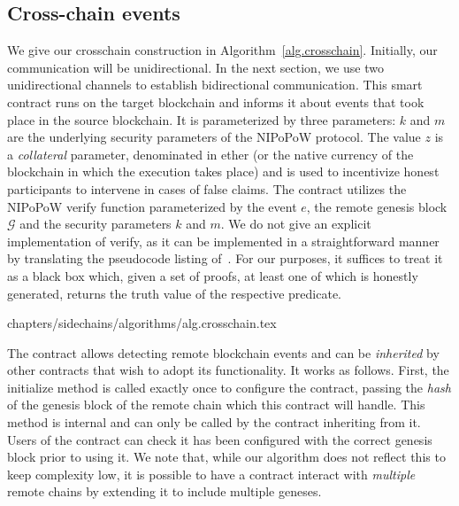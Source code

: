 \subsection*{Cross-chain events}

We give our \textsf{crosschain} construction in Algorithm~\ref{alg.crosschain}.
Initially, our communication will be unidirectional. In the next section, we
use two unidirectional channels to establish bidirectional communication. This
smart contract runs on the target blockchain and informs it about events that
took place in the source blockchain. It is parameterized by three parameters:
$k$ and $m$ are the underlying security parameters of the NIPoPoW protocol. The
value $z$ is a \emph{collateral} parameter, denominated in ether (or the native
currency of the blockchain in which the execution takes place) and is used to
incentivize honest participants to intervene in cases of false claims. The
contract utilizes the NIPoPoW \textsf{verify} function parameterized by the
event $e$, the remote genesis block $\mathcal{G}$ and the security parameters
$k$ and $m$. We do not give an explicit implementation of \textsf{verify}, as it
can be implemented in a straightforward manner by translating the pseudocode
listing of~\cite{nipopows}. For our purposes, it suffices to treat it as a black
box which, given a set of proofs, at least one of which is honestly generated,
returns the truth value of the respective predicate.

{chapters/sidechains/algorithms/alg.crosschain.tex}

The contract allows detecting remote blockchain events and can be \emph{inherited}
by other contracts that wish to adopt its functionality. It works as follows.
First, the \textsf{initialize} method is called exactly once to configure the
contract, passing the \emph{hash} of the genesis block of the remote chain which
this contract will handle. This method is \textsf{internal} and can only be
called by the contract inheriting from it. Users of the contract can check  it
has been configured with the correct genesis block prior to using it. We note
that, while our algorithm does not reflect this to keep complexity low, it is
possible to have a contract interact with \emph{multiple} remote chains by
extending it to include multiple geneses.

